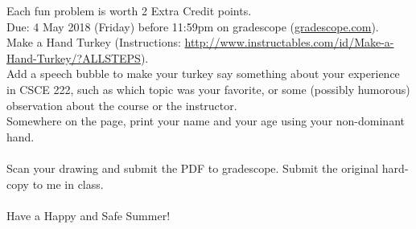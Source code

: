 \documentclass{article}
\theoremstyle{definition}
\begin{document}
\noindent
Each fun problem is worth 2 Extra Credit points.\\
Due: 4 May 2018 (Friday) before 11:59pm on gradescope (\url{gradescope.com}).\\

\noindent
Make a Hand Turkey (Instructions: \url{http://www.instructables.com/id/Make-a-Hand-Turkey/?ALLSTEPS}).\\
Add a speech bubble to make your turkey say something about your experience in CSCE 222, such as which topic was your favorite, or some (possibly humorous) observation about the course or the instructor.\\
Somewhere on the page, print your name and your age using your non-dominant hand.\\
\\
Scan your drawing and submit the PDF to gradescope.  Submit the original hard-copy to me in class.\\
\\
Have a Happy and Safe Summer!
\end{document}
